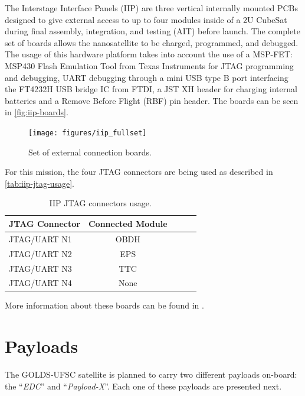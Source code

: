 The Interstage Interface Panels (IIP) are three vertical internally mounted PCBs designed to give external access to up to four modules inside of a 2U CubeSat during final assembly, integration, and testing (AIT) before launch. The complete set of boards allows the nanosatellite to be charged, programmed, and debugged. The usage of this hardware platform takes into account the use of a MSP-FET: MSP430 Flash Emulation Tool from Texas Instruments for JTAG programming and debugging, UART debugging through a mini USB type B port interfacing the FT4232H USB bridge IC from FTDI, a JST XH header for charging internal batteries and a Remove Before Flight (RBF) pin header. The boards can be seen in \autoref{fig:iip-boards}.

\begin{figure}[!ht]
    \begin{center}
        \texttt{[image: figures/iip\_fullset]}
        \caption{Set of external connection boards.}
        \label{fig:iip-boards}
    \end{center}
\end{figure}

For this mission, the four JTAG connectors are being used as described in \autoref{tab:iip-jtag-usage}.

\begin{table}[!h]
    \centering
    \begin{tabular}{lcccc}
        \toprule[1.5pt]
        \textbf{JTAG Connector} & \textbf{Connected Module} \\
        \midrule
        JTAG/UART N1 & OBDH \\
        JTAG/UART N2 & EPS \\
        JTAG/UART N3 & TTC \\
        JTAG/UART N4 & None \\
        \bottomrule[1.5pt]
    \end{tabular}
    \caption{IIP JTAG connectors usage.}
    \label{tab:iip-jtag-usage}
\end{table}

More information about these boards can be found in \cite{iip}.

\section{Payloads}

The GOLDS-UFSC satellite is planned to carry two different payloads on-board: the ``\textit{EDC}'' and ``\textit{Payload-X}''. Each one of these payloads are presented next.

